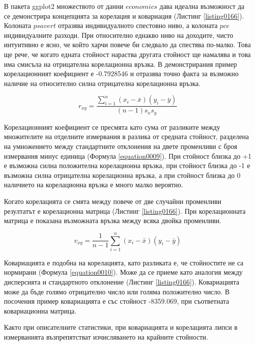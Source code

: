 В пакета ggplot2 множеството от данни $economics$ дава идеална възможност да се демонстрира концепцията за корелация и ковариация (Листинг \ref{listing0166}). Колоната $psavert$ отразява индивидуалното спестовно ниво, а колоната $pce$ индивидуалните разходи. При относително еднакво ниво на доходите, чисто интуитивно е ясно, че който харчи повече би следвало да спестява по-малко. Това ще рече, че когато едната стойност нараства другата стойност ще намалява и това има смисъла на отрицателна корелационна връзка. В демонстрирания пример корелационният коефициент е -0.7928546 и отразява точно факта за възможно наличие на относително силна отрицателна корелационна връзка. 

\begin{equation}
r_{xy} = \frac{\sum_{i=1}^{n}(x_i-\bar{x})(y_i-\bar{y})}{(n-1)s_xs_y}
\label{equation0009}
\end{equation}

Корелационният коефициент се пресмята като сума от разликите между множителите на отделните измервания в разлика от средната стойност, разделена на умножението между стандартните отклонения на двете променливи с броя измервания минус единица (Формула \ref{equation0009}). При стойност близка до +1 е възможна силна положителна корелационна връзка, при стойност близка до -1 е възможна силна отрицателна корелационна връзка, а при стойност близка до 0 наличието на корелационна връзка е много малко вероятно. 

Когато корелацията се смята между повече от две случайни променливи резултатът е корелационна матрица (Листинг \ref{listing0166}). При корелационната матрица е показана възможната връзка между всяка двойка променливи. 

\begin{equation}
v_{xy} = \frac{1}{n-1}\sum_{i=1}^{n}(x_i-\bar{x})(y_i-\bar{y})
\label{equation0010}
\end{equation}

Ковариацията е подобна на корелацията, като разликата е, че стойностите не са нормирани (Формула \ref{equation0010}). Може да се приеме като аналогия между дисперсията и стандартното отклонение (Листинг \ref{listing0166}). Ковариацията може да бъде голямо отрицателно число или голяма положително число. В посочения пример ковариацията е със стойност -8359.069, при съответната ковариационна матрица. 

Както при описателните статистики, при ковариацията и корелацията липси в измерванията възпрепятстват изчисляването на крайните стойности. 

